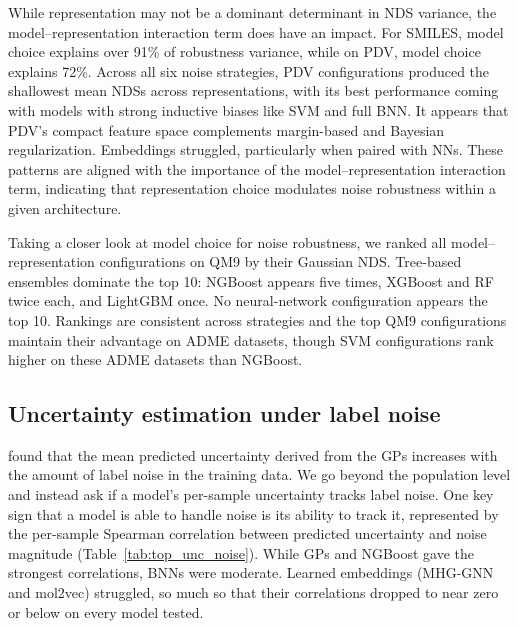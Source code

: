 \documentclass[pdflatex,sn-basic]{sn-jnl}%
\theoremstyle{thmstyleone}%
\theoremstyle{thmstyletwo}%
\theoremstyle{thmstylethree}%
\begin{document}
While representation may not be a dominant determinant in NDS variance, the model--representation interaction term does have an impact. For SMILES, model choice explains over 91\% of robustness variance, while on PDV, model choice explains 72\%. Across all six noise strategies, PDV configurations produced the shallowest mean NDSs across representations, with its best performance coming with models with strong inductive biases like SVM and full BNN. It appears that PDV's compact feature space complements margin-based and Bayesian regularization. Embeddings struggled, particularly when paired with NNs. These patterns are aligned with the importance of the model--representation interaction term, indicating that representation choice modulates noise robustness within a given architecture. 

Taking a closer look at model choice for noise robustness, we ranked all model--representation configurations on QM9 by their Gaussian NDS. Tree-based ensembles dominate the top 10: NGBoost appears five times, XGBoost and RF twice each, and LightGBM once. No neural-network configuration appears the top 10. Rankings are consistent across strategies and the top QM9 configurations maintain their advantage on ADME datasets, though SVM configurations rank higher on these ADME datasets than NGBoost.


\subsection{Uncertainty estimation under label noise}
\citet{Kolmar2021} found that the mean predicted uncertainty derived from the GPs increases with the amount of label noise in the training data. We go beyond the population level and instead ask if a model's per-sample uncertainty tracks label noise. One key sign that a model is able to handle noise is its ability to track it, represented by the per-sample Spearman correlation between predicted uncertainty and noise magnitude (Table~\ref{tab:top_unc_noise}). While GPs and NGBoost gave the strongest correlations, BNNs were moderate. Learned embeddings (MHG-GNN and mol2vec) struggled, so much so that their correlations dropped to near zero or below on every model tested. 
\end{document}
